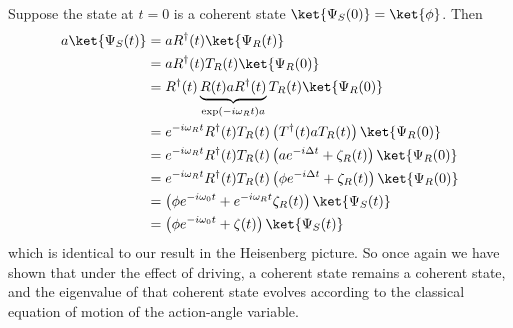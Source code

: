 
Suppose the state at $t=0$ is a coherent state $\ket{\Psi_S(0)} = \ket{\phi}$.
Then
\begin{align*}
  a \ket{\Psi_S(t)}
  &= a R^\dagger(t) \ket{\Psi_R(t)} \\
  &= a R^\dagger(t) T_R(t) \ket{\Psi_R(0)} \\
  &= R^\dagger(t) \underbrace{R(t) a R^\dagger(t)}_{\exp(-i \omega_R t) a} T_R(t) \ket{\Psi_R(0)} \\
  &= e^{-i \omega_R t} R^\dagger(t) T_R(t) \left(T^\dagger(t) a T_R(t) \right) \ket{\Psi_R(0)} \\
  &= e^{-i \omega_R t} R^\dagger(t) T_R(t) \left(a e^{-i \Delta t} + \zeta_R(t) \right) \ket{\Psi_R(0)} \\
  &= e^{-i \omega_R t} R^\dagger(t) T_R(t) \left(\phi e^{-i \Delta t} + \zeta_R(t) \right) \ket{\Psi_R(0)} \\
  &= \left(\phi e^{-i \omega_0 t} + e^{-i \omega_R t} \zeta_R(t) \right) \ket{\Psi_S(t)} \\
  &= \left(\phi e^{-i \omega_0 t} + \zeta(t) \right) \ket{\Psi_S(t)}
\end{align*}
which is identical to our result in the Heisenberg picture.
So once again we have shown that under the effect of driving, a coherent state remains a coherent state, and the eigenvalue of that coherent state evolves according to the classical equation of motion of the action-angle variable.
